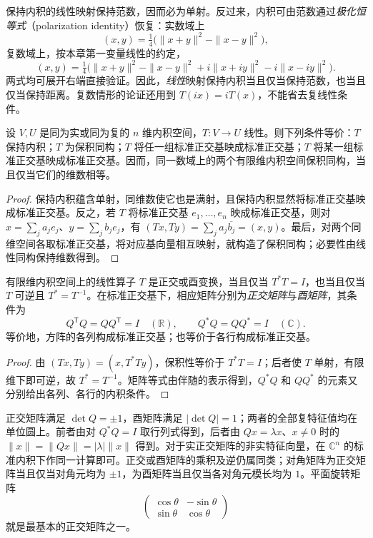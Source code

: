 保持内积的线性映射保持范数，因而必为单射。反过来，内积可由范数通过\emph{极化恒等式}（polarization identity）恢复：实数域上
\[
    (x,y)=\tfrac14\bigl(\|x+y\|^2-\|x-y\|^2\bigr),
\]
复数域上，按本章第一变量线性的约定，
\begin{equation}
\label{eq:polarization-identity}
    (x,y)=\tfrac14\bigl(\|x+y\|^2-\|x-y\|^2
    +i\|x+iy\|^2-i\|x-iy\|^2\bigr).
\end{equation}
两式均可展开右端直接验证。因此，\emph{线性}映射保持内积当且仅当保持范数，也当且仅当保持距离。复数情形的论证还用到 $T(ix)=iT(x)$，不能省去复线性条件。

\begin{theorem}
\label{thm:isometry-equivalences}
设 $V,U$ 是同为实或同为复的 $n$ 维内积空间，$T:V\to U$ 线性。则下列条件等价：$T$ 保持内积；$T$ 为保积同构；$T$ 将任一组标准正交基映成标准正交基；$T$ 将某一组标准正交基映成标准正交基。因而，同一数域上的两个有限维内积空间保积同构，当且仅当它们的维数相等。
\end{theorem}
\begin{proof}
保持内积蕴含单射，同维数使它也是满射，且保持内积显然将标准正交基映成标准正交基。反之，若 $T$ 将标准正交基 $e_1,\ldots,e_n$ 映成标准正交基，则对 $x=\sum_j a_je_j$、$y=\sum_j b_je_j$，有 $(Tx,Ty)=\sum_j a_j\overline{b_j}=(x,y)$。最后，对两个同维空间各取标准正交基，将对应基向量相互映射，就构造了保积同构；必要性由线性同构保持维数得到。
\end{proof}

\begin{proposition}
\label{prop:unitary-matrix}
有限维内积空间上的线性算子 $T$ 是正交或酉变换，当且仅当 $T^*T=I$，也当且仅当 $T$ 可逆且 $T^*=T^{-1}$。在标准正交基下，相应矩阵分别为\emph{正交矩阵}与\emph{酉矩阵}，其条件为
\[
    Q^{\mathsf T}Q=QQ^{\mathsf T}=I\quad(\mathbb R),
    \qquad Q^*Q=QQ^*=I\quad(\mathbb C).
\]
等价地，方阵的各列构成标准正交基；也等价于各行构成标准正交基。
\end{proposition}
\begin{proof}
由 $(Tx,Ty)=(x,T^*Ty)$，保积性等价于 $T^*T=I$；后者使 $T$ 单射，有限维下即可逆，故 $T^*=T^{-1}$。矩阵等式由伴随的表示得到，$Q^*Q$ 和 $QQ^*$ 的元素又分别给出各列、各行的内积条件。
\end{proof}

正交矩阵满足 $\det Q=\pm1$，酉矩阵满足 $|\det Q|=1$；两者的全部复特征值均在单位圆上。前者由对 $Q^*Q=I$ 取行列式得到，后者由 $Qx=\lambda x$、$x\ne0$ 时的 $\|x\|=\|Qx\|=|\lambda|\|x\|$ 得到。对于实正交矩阵的非实特征向量，在 $\mathbb C^n$ 的标准内积下作同一计算即可。正交或酉矩阵的乘积及逆仍属同类；对角矩阵为正交矩阵当且仅当对角元均为 $\pm1$，为酉矩阵当且仅当各对角元模长均为 $1$。平面旋转矩阵
\[
    \begin{pmatrix}\cos\theta&-\sin\theta\\
    \sin\theta&\cos\theta\end{pmatrix}
\]
就是最基本的正交矩阵之一。

